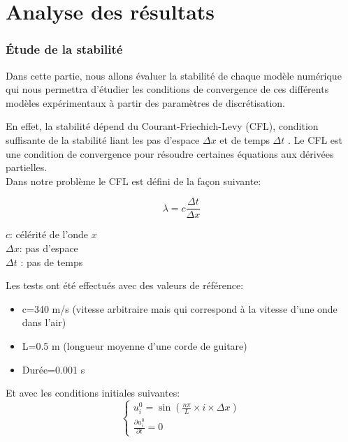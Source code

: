 \part{Analyse des résultats}


\section{Étude de la stabilité}

Dans cette partie, nous allons évaluer la stabilité de chaque modèle numérique qui nous permettra d'étudier les conditions de convergence de ces différents modèles expérimentaux à partir des paramètres de discrétisation.


En effet, la stabilité dépend du Courant-Friechich-Levy (CFL), condition suffisante de la stabilité liant les pas d'espace $\Delta x $ et de temps $\Delta t$ . Le CFL est une condition de convergence pour résoudre certaines équations aux dérivées partielles.\\

Dans notre problème le CFL est défini de la façon suivante:

\begin{minipage}{.6\textwidth}%
\centering
\begin{equation*}
     \lambda= c \frac{\Delta t}{\Delta x}  
\end{equation*}

\end{minipage}
\hfill
\begin{minipage}{.45\textwidth}%
\vspace{7mm}
$c$: célérité de l'onde $x$\\
$\Delta x$: pas d'espace\\
$\Delta t$ : pas de temps\\
     
\end{minipage}

Les tests ont été effectués avec des valeurs de référence:
\begin{itemize}
    \item c=340 m/s (vitesse arbitraire mais qui correspond à la vitesse d'une onde dans l'air)
    \item L=0.5 m (longueur moyenne d'une corde de guitare)
    \item Durée=0.001 s\\ 
\end{itemize}
Et avec les conditions initiales suivantes:
  \[
      \begin{cases}
        u^{0}_{i}=\sin(\frac{n \pi }{L} \times i \times \Delta x) \\
        \frac{\partial u^0_{i}}{\partial t}= 0
      \end{cases}
    \]\\


